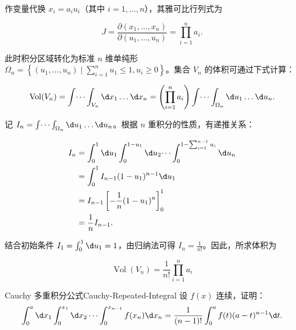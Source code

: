 \begin{solution}
    作变量代换 $x_i = a_i u_i$（其中 $i = 1, \dots, n$），其雅可比行列式为

    \begin{equation}
        J = \frac{\partial(x_1, \dots, x_n)}{\partial(u_1, \dots, u_n)} = \prod_{i=1}^n a_i.
    \end{equation}

    此时积分区域转化为标准 $n$ 维单纯形 $\Omega_n = \left\{ (u_1, \dots, u_n) \mid \sum_{i=1}^n u_1 \leqslant 1, u_i \geqslant 0 \right\}$。集合 $V_n$ 的体积可通过下式计算：

    \begin{equation}
        \operatorname{Vol}(V_n) = \int \dots \int_{V_n} \d x_1 \dots \d x_n = \left( \prod_{i=1}^n a_i \right) \int \dots \int_{\Omega_n} \d u_1 \dots \d u_n.
    \end{equation}

    记 $I_n = \int \dots \int_{\Omega_n} \d u_1 \dots \d u_n$。根据 $n$ 重积分的性质，有递推关系：

    \begin{equation}
        \begin{aligned}
            I_n & = \int_0^1 \d u_1 \int_0^{1-u_1} \d u_2 \dots \int_0^{1-\sum_{i=1}^{n-1} u_i} \d u_n \\
                & = \int_0^1 I_{n-1}(1-u_1)^{n-1} \d u_1                                               \\
                & = I_{n-1} \left[ -\frac{1}{n} (1-u_1)^n \right]_0^1                                  \\
                & = \frac{1}{n} I_{n-1}.
        \end{aligned}
    \end{equation}

    结合初始条件 $I_1 = \int_0^1 \d u_1 = 1$，由归纳法可得 $I_n = \frac{1}{n!}$。因此，所求体积为

    \begin{equation}
        \boxed{\operatorname{Vol}(V_n) = \frac{1}{n!} \prod_{i=1}^n a_i}
    \end{equation}
\end{solution}

\begin{problem}{Cauchy 多重积分公式}{Cauchy-Repeated-Integral}
    设 $f(x)$ 连续，证明：
    \begin{equation}
        \int_{0}^{a} \d x_1 \int_{0}^{x_1} \d x_2 \cdots \int_{0}^{x_{n-1}} f(x_n) \d x_n = \frac{1}{(n-1)!} \int_{0}^{a} f(t)(a-t)^{n-1} \d t.
    \end{equation}
\end{problem}

